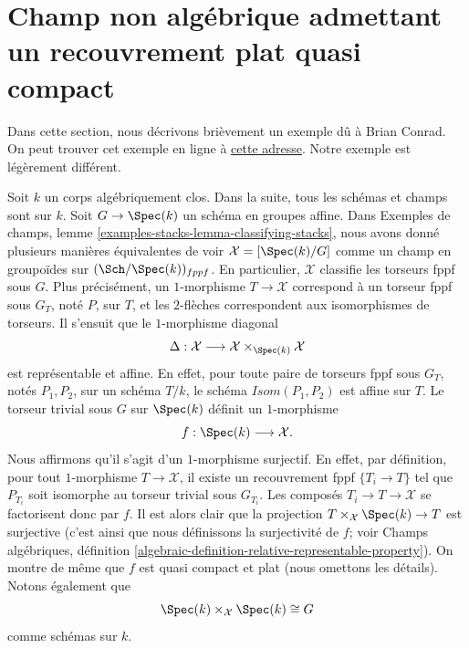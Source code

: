 \section[Champ non algébrique à recouvrement plat quasi compact]{Champ non algébrique admettant un recouvrement plat quasi compact}
\label{section-not-algebraic-stack}

\noindent
Dans cette section, nous décrivons brièvement un exemple dû à Brian Conrad.
On peut trouver cet exemple en ligne à
\href{https://mathoverflow.net/questions/15082/fpqc-covers-of-stacks/15269#15269}{cette adresse}.
Notre exemple est légèrement différent.

\medskip\noindent
Soit $k$ un corps algébriquement clos.
Dans la suite, tous les schémas et champs sont sur $k$.
Soit $G \to \Spec(k)$ un schéma en groupes affine.
Dans Exemples de champs,
lemme \ref{examples-stacks-lemma-classifying-stacks},
nous avons donné plusieurs manières équivalentes de voir
$\mathcal{X} = [\Spec(k)/G]$ comme un champ en groupoïdes sur
$(\Sch/\Spec(k))_{fppf}$. En particulier, $\mathcal{X}$ classifie les
torseurs fppf sous $G$. Plus précisément, un $1$-morphisme $T \to \mathcal{X}$
correspond à un torseur fppf sous $G_T$, noté $P$, sur $T$, et les $2$-flèches
correspondent aux isomorphismes de torseurs. Il s'ensuit que
le $1$-morphisme diagonal
$$
\Delta :
\mathcal{X}
\longrightarrow
\mathcal{X} \times_{\Spec(k)} \mathcal{X}
$$
est représentable et affine. En effet, pour toute paire
de torseurs fppf sous $G_T$, notés $P_1, P_2$, sur un schéma $T/k$, le
schéma $\mathit{Isom}(P_1, P_2)$ est affine sur $T$.
Le torseur trivial sous $G$ sur $\Spec(k)$ définit un $1$-morphisme
$$
f : \Spec(k) \longrightarrow \mathcal{X}.
$$
Nous affirmons qu'il s'agit d'un $1$-morphisme surjectif. En effet,
par définition, pour tout $1$-morphisme $T \to \mathcal{X}$, il existe
un recouvrement fppf $\{T_i \to T\}$ tel que $P_{T_i}$ soit isomorphe
au torseur trivial sous $G_{T_i}$. Les composés
$T_i \to T \to \mathcal{X}$ se factorisent donc par $f$. Il est alors clair que
la projection $T \times_\mathcal{X} \Spec(k) \to T$
est surjective (c'est ainsi que nous définissons la surjectivité de $f$; voir
Champs algébriques,
définition \ref{algebraic-definition-relative-representable-property}).
On montre de même que $f$ est quasi compact et plat (nous omettons les détails).
Notons également que
$$
\Spec(k) \times_\mathcal{X} \Spec(k) \cong G
$$
comme schémas sur $k$.

